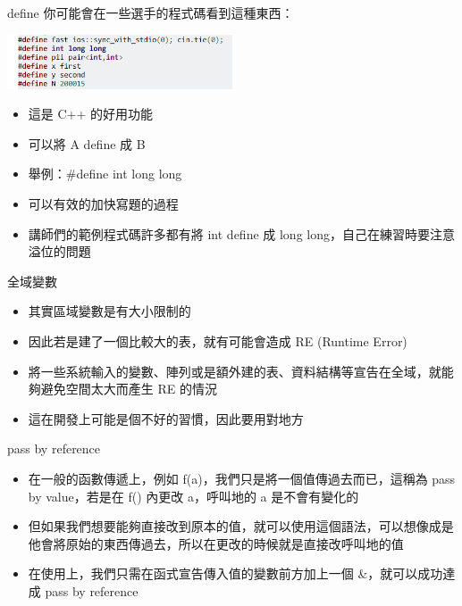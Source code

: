\documentclass[aspectratio=169]{beamer}
\begin{document}
	\begin{frame}{define}
		你可能會在一些選手的程式碼看到這種東西：
		\begin{center}
			\includegraphics[width=0.5\textwidth]{src/victorgao_define.png}
		\end{center}

		\begin{itemize}
			\item<1-> 這是 C++ 的好用功能
			\item<1-> 可以將 A define 成 B
			\item<2-> 舉例：\#define int long long
			\item<3-> 可以有效的加快寫題的過程
			\item<4-> 講師們的範例程式碼許多都有將 int define 成 long long，自己在練習時要注意溢位的問題
		\end{itemize}
	\end{frame}

	\begin{frame}{全域變數}
		\begin{itemize}
			\item<1-> 其實區域變數是有大小限制的
			\item<2-> 因此若是建了一個比較大的表，就有可能會造成 RE (Runtime Error)
			\item<3-> 將一些系統輸入的變數、陣列或是額外建的表、資料結構等宣告在全域，就能夠避免空間太大而產生 RE 的情況
			\item<4-> 這在開發上可能是個不好的習慣，因此要用對地方
		\end{itemize}
	\end{frame}

	\begin{frame}{pass by reference}
		\begin{itemize}
			\item<1-> 在一般的函數傳遞上，例如 f(a)，我們只是將一個值傳過去而已，這稱為 pass by value，若是在 f() 內更改 a，呼叫地的 a 是不會有變化的
			\item<2-> 但如果我們想要能夠直接改到原本的值，就可以使用這個語法，可以想像成是他會將原始的東西傳過去，所以在更改的時候就是直接改呼叫地的值
			\item<3-> 在使用上，我們只需在函式宣告傳入值的變數前方加上一個 \&，就可以成功達成 pass by reference
		\end{itemize}
	\end{frame}
\end{document}
